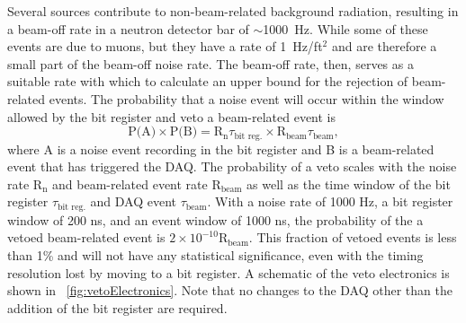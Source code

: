 Several sources contribute to non-beam-related background radiation, resulting in a beam-off rate in a neutron detector bar of $\sim$1000~Hz.  While some of these events are due to muons, but they have a rate of 1~Hz/ft$^2$ and are therefore a small part of the beam-off noise rate.  The beam-off rate, then, serves as a suitable rate with which to calculate an upper bound for the rejection of beam-related events.  The probability that a noise event will occur within the window allowed by the bit register and veto a beam-related event is
\begin{equation}
\text{P(A)}\times\text{P(B)} = \text{R}_{\text{n}}\tau_{\text{bit reg.}}\times\text{R}_{\text{beam}}\tau_{\text{beam}},
\end{equation}
where A is a noise event recording in the bit register and B is a beam-related event that has triggered the DAQ.  The probability of a veto scales with the noise rate $\text{R}_{\text{n}}$ and beam-related event rate $\text{R}_{\text{beam}}$ as well as the time window of the bit register $\tau_{\text{bit reg.}}$ and DAQ event $\tau_{\text{beam}}$.  With a noise rate of 1000 Hz, a bit register window of 200 ns, and an event window of 1000 ns, the probability of the a vetoed beam-related event is $2\times10^{-10}\text{R}_{\text{beam}}$.  This fraction of vetoed events is less than 1\% and will not have any statistical significance, even with the timing resolution lost by moving to a bit register.  A schematic of the veto electronics is shown in {\fig}~\ref{fig:vetoElectronics}.  Note that no changes to the DAQ other than the addition of the bit register are required.
